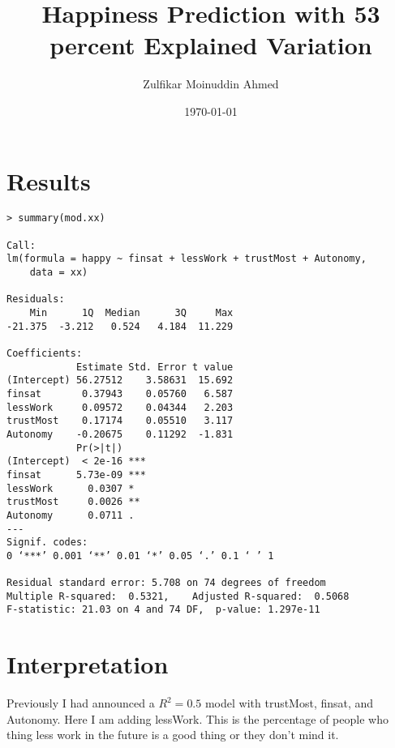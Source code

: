 \documentclass{amsart}
\title{Happiness Prediction with 53 percent Explained Variation}
\author{Zulfikar Moinuddin Ahmed}
\date{\today}
\begin{document}
\maketitle


\section{Results}

\begin{verbatim}
> summary(mod.xx)

Call:
lm(formula = happy ~ finsat + lessWork + trustMost + Autonomy, 
    data = xx)

Residuals:
    Min      1Q  Median      3Q     Max 
-21.375  -3.212   0.524   4.184  11.229 

Coefficients:
            Estimate Std. Error t value
(Intercept) 56.27512    3.58631  15.692
finsat       0.37943    0.05760   6.587
lessWork     0.09572    0.04344   2.203
trustMost    0.17174    0.05510   3.117
Autonomy    -0.20675    0.11292  -1.831
            Pr(>|t|)    
(Intercept)  < 2e-16 ***
finsat      5.73e-09 ***
lessWork      0.0307 *  
trustMost     0.0026 ** 
Autonomy      0.0711 .  
---
Signif. codes:  
0 ‘***’ 0.001 ‘**’ 0.01 ‘*’ 0.05 ‘.’ 0.1 ‘ ’ 1

Residual standard error: 5.708 on 74 degrees of freedom
Multiple R-squared:  0.5321,	Adjusted R-squared:  0.5068 
F-statistic: 21.03 on 4 and 74 DF,  p-value: 1.297e-11
\end{verbatim}

\section{Interpretation}

Previously I had announced a $R^2=0.5$ model with trustMost, finsat, and Autonomy.  Here I am adding lessWork.  This is the percentage of people who thing less work in the future is a good thing or they don't mind it.  
\end{document}
